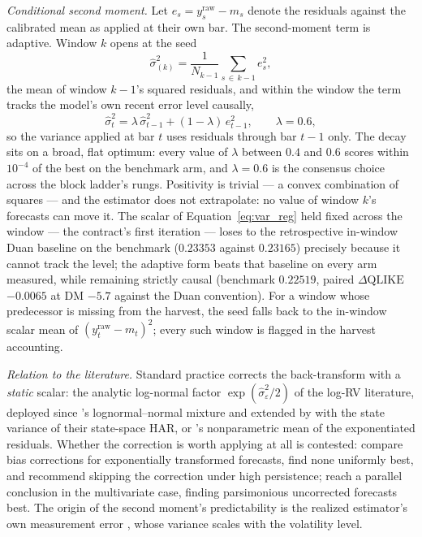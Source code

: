 \emph{Conditional second moment.} Let
$e_s = y^{\mathrm{raw}}_s - m_s$ denote the residuals against the
calibrated mean as applied at their own bar. The second-moment term is
adaptive. Window $k$ opens at the seed
\begin{equation}
    \hat{\sigma}^2_{(k)}
    = \frac{1}{N_{k-1}} \sum_{s \,\in\, k-1} e_s^2,
    \label{eq:var_reg}
\end{equation}
the mean of window $k-1$'s squared residuals, and within the window the
term tracks the model's own recent error level causally,
\begin{equation}
    \hat{\sigma}^2_t
    = \lambda\, \hat{\sigma}^2_{t-1} + (1 - \lambda)\, e_{t-1}^2,
    \qquad \lambda = 0.6,
    \label{eq:var_ewma}
\end{equation}
so the variance applied at bar $t$ uses residuals through bar $t-1$
only. The decay sits on a broad, flat optimum: every value of $\lambda$
between $0.4$ and $0.6$ scores within $10^{-4}$ of the best on the
benchmark arm, and $\lambda = 0.6$ is the consensus choice across the
block ladder's rungs. Positivity is trivial --- a convex combination of
squares --- and the estimator does not extrapolate: no value of window
$k$'s forecasts can move it. The scalar of
Equation~\eqref{eq:var_reg} held fixed across the window --- the
contract's first iteration --- loses to the retrospective in-window Duan
baseline on the benchmark ($0.23353$ against $0.23165$) precisely
because it cannot track the level; the adaptive form beats that
baseline on every arm measured, while remaining strictly causal
(benchmark $0.22519$, paired $\Delta\mathrm{QLIKE}$ $-0.0065$ at DM
$-5.7$ against the Duan convention). For a window whose predecessor is
missing from the harvest, the seed falls back to the in-window scalar
mean of $(y^{\mathrm{raw}}_t - m_t)^2$; every such window is flagged in
the harvest accounting.

\emph{Relation to the literature.} Standard practice corrects the
back-transform with a \emph{static} scalar: the analytic log-normal
factor $\exp(\hat\sigma^2_\varepsilon / 2)$ of the log-RV literature,
deployed since \citet{AndersenBollerslevDieboldLabys2003}'s
lognormal--normal mixture and extended by \citet{BekiermanManner2018}
with the state variance of their state-space HAR, or
\citet{Duan1983}'s nonparametric mean of the exponentiated residuals.
Whether the correction is worth applying at all is contested:
\citet{DemetrescuGolosnoyTitova2020} compare bias corrections for
exponentially transformed forecasts, find none uniformly best, and
recommend skipping the correction under high persistence;
\citet{HalbleibVoev2011} reach a parallel conclusion in the
multivariate case, finding parsimonious uncorrected forecasts best.
The origin of the second moment's predictability is the realized
estimator's own measurement error
\citep{AsaiMcAleerMedeiros2012}, whose variance scales with the
volatility level.

